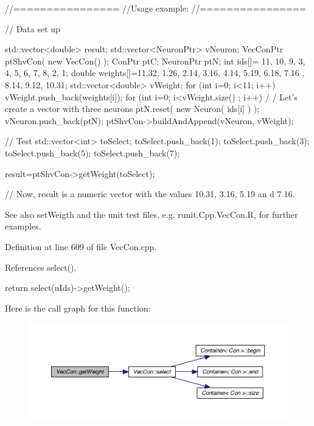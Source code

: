 \begin{DoxyCode}
        //================
        //Usage example:
        //================

        // Data set up

                std::vector<double> result;
                std::vector<NeuronPtr> vNeuron;
                VecConPtr       ptShvCon( new VecCon() );
                ConPtr  ptC;
                NeuronPtr ptN;
                int ids[]= {11, 10, 9, 3, 4, 5, 6, 7, 8, 2, 1};
                double weights[]={11.32, 1.26, 2.14, 3.16, 4.14, 5.19, 6.18, 7.16
      , 8.14, 9.12, 10.31};
                std::vector<double> vWeight;
                for (int i=0; i<11; i++) {
                        vWeight.push_back(weights[i]);
                }
                for (int i=0; i<vWeight.size() ; i++) {                         /
      / Let's create a vector with three neurons
                        ptN.reset( new Neuron( ids[i] ) );
                        vNeuron.push_back(ptN);
                }
                ptShvCon->buildAndAppend(vNeuron, vWeight);

        // Test
                std::vector<int> toSelect;
                toSelect.push_back(1);
                toSelect.push_back(3);
                toSelect.push_back(5);
                toSelect.push_back(7);

                result=ptShvCon->getWeight(toSelect);

        // Now, result is a numeric vector with the values  10.31, 3.16,  5.19 an
      d 7.16.
\end{DoxyCode}


\begin{DoxySeeAlso}{See also}
setWeigth and the unit test files, e.g. runit.Cpp.VecCon.R, for further examples. 
\end{DoxySeeAlso}


Definition at line 609 of file VecCon.cpp.



References select().


\begin{DoxyCode}
{
  return select(nIds)->getWeight();
}
\end{DoxyCode}


Here is the call graph for this function:
\nopagebreak
\begin{figure}[H]
\begin{center}
\leavevmode
\includegraphics[width=400pt]{class_vec_con_ab9b05c1c3e55cb2994af791bd05dfec0_cgraph}
\end{center}
\end{figure}


